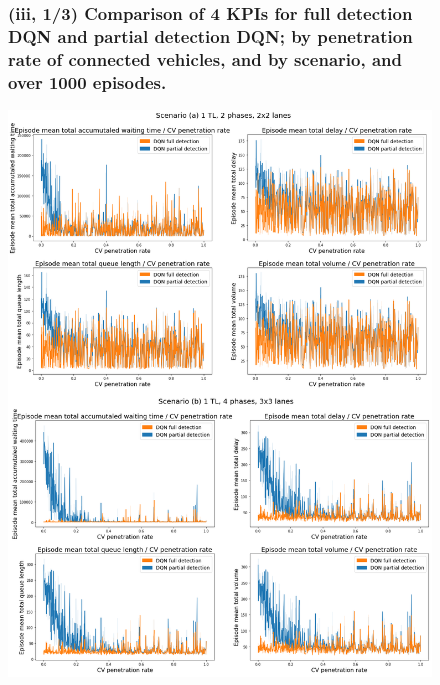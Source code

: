 \begin{figure}[h]
\subsubsection*{(iii, 1/3) Comparison of 4 KPIs for full detection DQN and partial detection DQN; by penetration rate of connected vehicles, and by scenario, and over 1000 episodes.}
\includegraphics[width=\textwidth]{img/Appendix/3_1-2.png}
\centering
\end{figure}
\restoregeometry

\pagebreak

